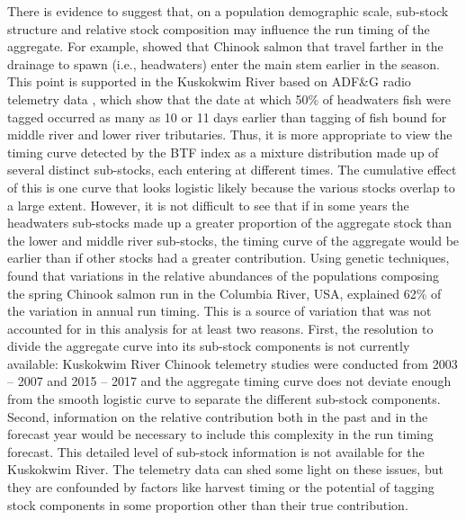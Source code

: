 \documentclass[12pt,]{book}
\theoremstyle{definition}
\theoremstyle{definition}
\theoremstyle{definition}
\theoremstyle{remark}
\begin{document}
There is evidence to suggest that, on a population demographic scale,
sub-stock structure and relative stock composition may influence the run
timing of the aggregate. For example, \citet{clark-etal-2015} showed
that Chinook salmon that travel farther in the drainage to spawn (i.e.,
headwaters) enter the main stem earlier in the season. This point is
supported in the Kuskokwim River based on ADF\&G radio telemetry data
\citep{stuby-2007, smith-liller-2017}, which show that the date at which
50\% of headwaters fish were tagged occurred as many as 10 or 11 days
earlier than tagging of fish bound for middle river and lower river
tributaries. Thus, it is more appropriate to view the timing curve
detected by the BTF index as a mixture distribution made up of several
distinct sub-stocks, each entering at different times. The cumulative
effect of this is one curve that looks logistic likely because the
various stocks overlap to a large extent. However, it is not difficult
to see that if in some years the headwaters sub-stocks made up a greater
proportion of the aggregate stock than the lower and middle river
sub-stocks, the timing curve of the aggregate would be earlier than if
other stocks had a greater contribution. Using genetic techniques,
\citet{anderson-beer-2009} found that variations in the relative
abundances of the populations composing the spring Chinook salmon run in
the Columbia River, USA, explained 62\% of the variation in annual run
timing. This is a source of variation that was not accounted for in this
analysis for at least two reasons. First, the resolution to divide the
aggregate curve into its sub-stock components is not currently
available: Kuskokwim River Chinook telemetry studies were conducted from
2003 -- 2007 and 2015 -- 2017 and the aggregate timing curve does not
deviate enough from the smooth logistic curve to separate the different
sub-stock components. Second, information on the relative contribution
both in the past and in the forecast year would be necessary to include
this complexity in the run timing forecast. This detailed level of
sub-stock information is not available for the Kuskokwim River. The
telemetry data can shed some light on these issues, but they are
confounded by factors like harvest timing \citep[some stocks may be
harvested preferentially purely due to the timing of the fishery, which
does not mirror that of the aggregate run;][]{hamazaki-2008} or the
potential of tagging stock components in some proportion other than
their true contribution.
\end{document}
